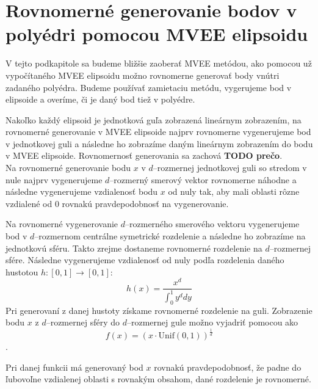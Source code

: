 \section {Rovnomerné generovanie bodov v polyédri pomocou MVEE elipsoidu}

V tejto podkapitole sa budeme bližšie zaoberať MVEE metódou, ako pomocou už vypočítaného MVEE elipsoidu možno rovnomerne generovať body vnútri zadaného polyédra. Budeme používať zamietaciu metódu, vygerujeme bod v elipsoide a overíme, či je daný bod tiež v polyédre.

Nakoľko každý elipsoid je jednotková guľa zobrazená lineárnym zobrazením, na rovnomerné generovanie v MVEE elipsoide najprv rovnomerne vygenerujeme bod v jednotkovej guli a následne ho zobrazíme daným lineárnym zobrazením do bodu v MVEE elipsoide. Rovnomernosť generovania sa zachová \textbf{TODO prečo}.\\
\label{generovanie_v_mvee}
Na rovnomerné generovanie bodu $x$ v $d$--rozmernej jednotkovej guli so stredom v nule najprv vygenerujeme $d$--rozmerný smerový vektor rovnomerne náhodne a následne vygenerujeme vzdialenosť bodu $x$ od nuly tak, aby mali oblasti rôzne vzdialené od $0$ rovnakú pravdepodobnosť na vygenerovanie.

Na rovnomerné vygenerovanie $d$--rozmerného smerového vektoru vygenerujeme bod v $d$--rozmernom centrálne symetrické rozdelenie a následne ho zobrazíme na jednotkovú sféru. Takto zrejme dostaneme rovnomerné rozdelenie na $d$--rozmernej sfére. Následne vygenerujeme vzdialenosť od nuly podľa rozdelenia daného hustotou $h:[0,1] \rightarrow [0,1]$: $$h(x)=\frac{x^d}{\int_0^1 y^d dy}$$
Pri generovaní z danej hustoty získame rovnomerné rozdelenie na guli. Zobrazenie bodu $x$ z $d$--rozmernej sféry do $d$--rozmernej gule možno vyjadriť pomocou  ako $$f(x)=(x\cdot\text{Unif}(0,1))^{\frac{1}{d}}$$.

Pri danej funkcii má generovaný bod $x$ rovnakú pravdepodobnosť, že padne do ľubovoľne vzdialenej oblasti s rovnakým obsahom, dané rozdelenie je rovnomerné.